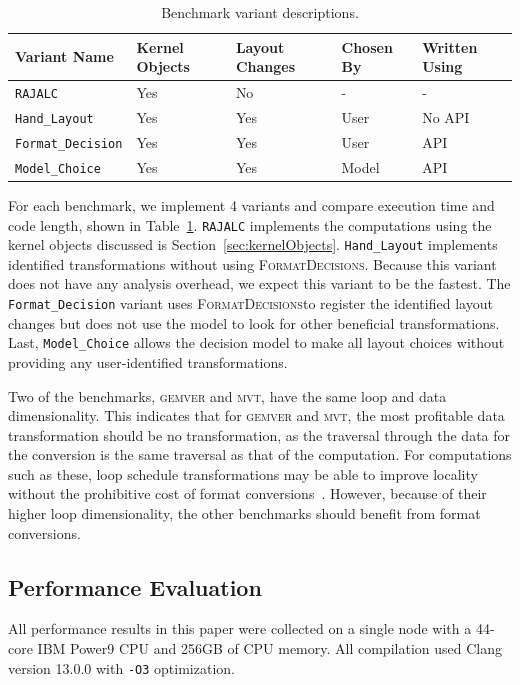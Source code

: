 \documentclass[sigconf,review=true]{acmart}
\newcommand{\FormatDecisions}[0]{{\textsc{FormatDecisions}}}
\begin{document}
\begin{table}
	\centering
	\begin{tabular}{| p{2.4cm} | p{1.1cm} | p{1.1cm} | p{1cm} | p{1cm}|}
		\hline
		 \raggedright Variant \linebreak Name & \raggedright Kernel Objects & \raggedright Layout Changes & \raggedright Chosen By &  Written Using \tabularnewline
		\hline
		\verb.RAJALC. & Yes & No & - & - \\
		\verb.Hand_Layout. & Yes & Yes & User & No API \\
		\verb.Format_Decision. & Yes & Yes & User & API \\
		\verb.Model_Choice. & Yes & Yes & Model & API \\
		\hline
	\end{tabular}
	\caption{Benchmark variant descriptions.}
	\label{VariantDescription}
\end{table}
For each benchmark, we implement 4 variants and compare execution time and code length, shown in Table~\ref{VariantDescription}.
\verb.RAJALC. implements the computations using the kernel objects discussed is Section~\ref{sec:kernelObjects}. 
\verb.Hand_Layout. implements identified transformations without using \FormatDecisions. 
Because this variant does not have any analysis overhead, we expect this variant to be the fastest.
The \verb.Format_Decision. variant uses \FormatDecisions to register the identified layout changes but does not use the model to look for other beneficial transformations.
Last, \verb.Model_Choice. allows the decision model to make all layout choices without providing any user-identified transformations.

Two of the benchmarks, \textsc{gemver} and \textsc{mvt}, have the same loop and data dimensionality. 
This indicates that for \textsc{gemver} and \textsc{mvt}, the most profitable data transformation should be no transformation, as the traversal through the data for the conversion is the same traversal as that of the computation.
For computations such as these, loop schedule transformations may be able to improve locality without the prohibitive cost of format conversions~\cite{kandemir1998improving}.
However, because of their higher loop dimensionality, the other benchmarks should benefit from format conversions.

\subsection{Performance Evaluation}
All performance results in this paper were collected on a single node with a 44-core IBM Power9 CPU and 256GB of CPU memory.
All compilation used Clang version 13.0.0 with \verb.-O3. optimization.
\label{sec:systemDetails}
\end{document}
